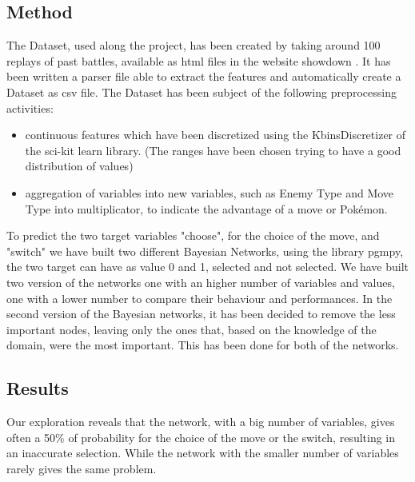 \documentclass[letterpaper]{article}
\begin{document}
\subsection{Method}
The Dataset, used along the project, has been created by taking around 100 replays of past battles, available as html files in the website showdown \cite{showdown}. It has been written a parser file able to extract the features and automatically create a Dataset as csv file.
The Dataset has been subject of the following preprocessing activities:
\begin{itemize}
    \item continuous features which have been discretized using the KbinsDiscretizer of the sci-kit learn library. (The ranges have been chosen trying to have a good distribution of values)
    \item aggregation of variables into new variables, such as Enemy Type and Move Type into multiplicator, to indicate the advantage of a move or Pokémon.
\end{itemize}
To predict the two target variables "choose", for the choice of the move, and "switch" we have built two different Bayesian Networks, using the library pgmpy, the two target can have as value 0 and 1, selected and not selected.
We have built two version of the networks one with an higher number of variables and values, one with a lower number to compare their behaviour and performances.
In the second version of the Bayesian networks, it has been decided to remove the less important nodes, leaving only the ones that, based on the knowledge of the domain, were the most important. This has been done for both of the networks.


\subsection{Results}
Our exploration reveals that the network, with a big number of variables, gives often a 50\% of probability for the choice of the move or the switch, resulting in an inaccurate selection. While the network with the smaller number of variables rarely gives the same problem.
\end{document}
